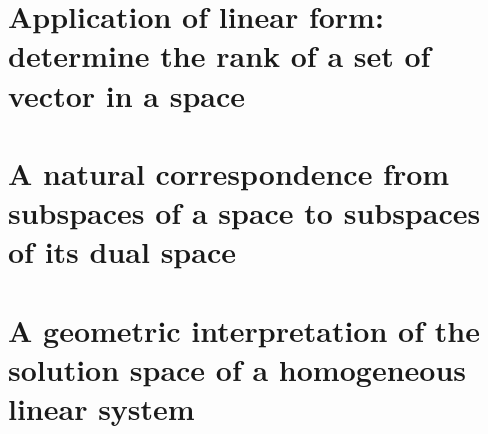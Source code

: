 \documentclass[onecolumn]{ctexart}
\begin{document}
\section{Application of linear form: determine the rank of a set of vector in a space}

\section{A natural correspondence from subspaces of a space to subspaces of its dual space}

\section{A geometric interpretation of the solution space of a homogeneous linear system}
\end{document}
